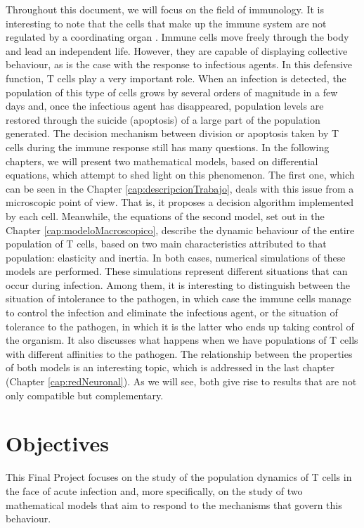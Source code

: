 Throughout this document, we will focus on the field of immunology. It is interesting to note that the cells that make up the immune system are not regulated by a coordinating organ \citep{arias2016emergent}. Immune cells move freely through the body and lead an independent life. However, they are capable of displaying collective behaviour, as is the case with the response to infectious agents. In this defensive function, T cells play a very important role. When an infection is detected, the population of this type of cells grows by several orders of magnitude in a few days and, once the infectious agent has disappeared, population levels are restored through the suicide (apoptosis) of a large part of the population generated. The decision mechanism between division or apoptosis taken by T cells during the immune response still has many questions. In the following chapters, we will present two mathematical models, based on differential equations, which attempt to shed light on this phenomenon. The first one, which can be seen in the Chapter \ref{cap:descripcionTrabajo}, deals with this issue from a microscopic point of view. That is, it proposes a decision algorithm implemented by each cell. Meanwhile, the equations of the second model, set out in the Chapter \ref{cap:modeloMacroscopico}, describe the dynamic behaviour of the entire population of T cells, based on two main characteristics attributed to that population: elasticity and inertia. In both cases, numerical simulations of these models are performed. These simulations represent different situations that can occur during infection. Among them, it is interesting to distinguish between the situation of intolerance to the pathogen, in which case the immune cells manage to control the infection and eliminate the infectious agent, or the situation of tolerance to the pathogen, in which it is the latter who ends up taking control of the organism. It also discusses what happens when we have populations of T cells with different affinities to the pathogen. The relationship between the properties of both models is an interesting topic, which is addressed in the last chapter (Chapter \ref{cap:redNeuronal}). As we will see, both give rise to results that are not only compatible but complementary. 



\section{Objectives}


This Final Project focuses on the study of the population dynamics of T cells in the face of acute infection and, more specifically, on the study of two mathematical models that aim to respond to the mechanisms that govern this behaviour.

